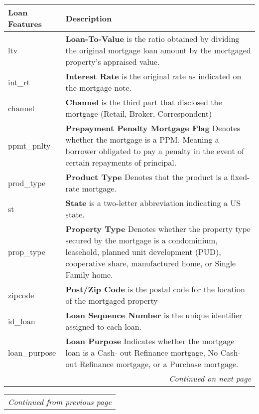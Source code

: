 \begin{appendices}
\begin{center}
\begin{tabular}{|p{4cm}|p{10cm}|}
                \hline \textbf{Loan Features} & \textbf{Description} \\ \hline \hline
                ltv & \textbf{Loan-To-Value} is the ratio obtained by dividing the original mortgage loan amount by the mortgaged property’s appraised value. \\ \hline
                int\_rt & \textbf{Interest Rate} is the original rate as indicated on the mortgage note. \\ \hline
                channel & \textbf{Channel} is the third part that disclosed the mortgage (Retail, Broker, Correspondent) \\ \hline
                ppmt\_pnlty & \textbf{Prepayment Penalty Mortgage Flag} Denotes whether the mortgage is a PPM. Meaning a borrower obligated to pay a penalty in the event of certain repayments of principal. \\ \hline
                prod\_type & \textbf{Product Type} Denotes that the product is a fixed-rate mortgage. \\ \hline
                st & \textbf{State} is a two-letter abbreviation indicating a US state. \\ \hline
                prop\_type & \textbf{Property Type} Denotes whether the property type secured by the mortgage is a condominium, leasehold, planned unit development (PUD), cooperative share, manufactured home, or Single Family home. \\ \hline
                zipcode & \textbf{Post/Zip Code} is the postal code for the location of the mortgaged property \\ \hline
                id\_loan & \textbf{Loan Sequence Number} is the unique identifier assigned to each loan. \\ \hline
                loan\_purpose & \textbf{Loan Purpose} Indicates whether the mortgage loan is a Cash- out Refinance mortgage, No Cash-out Refinance mortgage, or a Purchase mortgage. \\ \hline
                \multicolumn{2}{r}{\textit{Continued on next page}} \\
            
            \end{tabular}
    \end{center}

    \clearpage

    \begin{center}
        \begin{tabular}{|p{4cm}|p{10cm}|}
            \multicolumn{2}{r}{\textit{Continued from previous page}} \\


\end{tabular}
\end{center}
\end{appendices}

